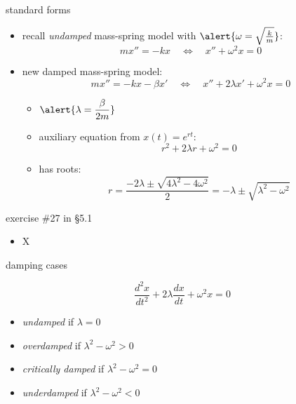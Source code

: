 \documentclass[urlcolor=blue]{beamer}
\begin{document}
\begin{frame}{standard forms}

\begin{itemize}
\item recall \emph{undamped} mass-spring model with $\alert{\omega = \sqrt{\frac{k}{m}}}$:
    $$m x'' = - k x \quad \iff \quad x'' + \omega^2 x = 0$$
\item new damped mass-spring model:
    $$m x'' = - k x - \beta x' \quad \iff \quad x'' + 2 \lambda x' + \omega^2 x = 0$$

\vspace{-2mm}
    \begin{itemize}
    \item $\displaystyle \alert{\lambda = \frac{\beta}{2m}}$
    \item auxiliary equation from $x(t)=e^{rt}$:
        $$r^2 + 2\lambda r + \omega^2=0$$
    \item has roots:
        $$r = \frac{-2\lambda \pm \sqrt{4 \lambda^2 - 4 \omega^2}}{2} = -\lambda \pm \sqrt{\lambda^2 - \omega^2}$$
    \end{itemize}
\end{itemize}
\end{frame}


\begin{frame}{exercise \#27 in \S5.1}

\begin{itemize}
\item X
\end{itemize}
\end{frame}


\begin{frame}{damping cases}

$$\frac{d^2x}{dt^2} + 2 \lambda \frac{dx}{dt} + \omega^2 x=0$$

\begin{itemize}
\item \emph{undamped} if $\lambda = 0$
\item \emph{overdamped} if $\lambda^2-\omega^2 > 0$
\item \emph{critically damped} if $\lambda^2-\omega^2 = 0$
\item \emph{underdamped} if $\lambda^2-\omega^2 < 0$
\end{itemize}
\end{frame}
\end{document}
